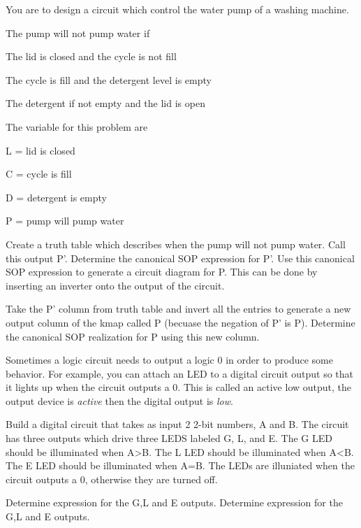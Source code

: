

You are to design a circuit which control the water pump of
a washing machine.

The pump will not pump water if
\begin{description}
\item The lid is closed and the cycle is not fill
\item The cycle is fill and the detergent level is empty
\item The detergent if not empty and the lid is open
\end{description}

The variable for this problem are
\begin{description}
\item L = lid is closed
\item C = cycle is fill
\item D = detergent is empty
\item P = pump will pump water
\end{description}

Create a truth table which describes when the pump will not
pump water.  Call this output P'.  Determine the canonical SOP 
expression for P'.  Use this canonical SOP expression to generate 
a circuit diagram for P.  This can be done by inserting an 
inverter onto the output of the circuit.

Take the P' column from truth table and invert all the entries
to generate a new output column of the kmap called P (becuase
the negation of P' is P).  Determine the canonical SOP 
realization for P using this new column.




Sometimes a logic circuit needs to output a logic 0 in order to
produce some behavior.  For example, you can attach an LED to
a digital circuit output so that it lights up when the circuit 
outputs a 0.  This is called an active low output, the output
device is {\it active} then the digital output is {\it low}.

Build a digital circuit that takes as input 2 2-bit numbers,
A and B.  The circuit has three outputs which drive three
LEDS labeled G, L, and E.  
The G LED should be illuminated when A>B.
The L LED should be illuminated when A<B.
The E LED should be illuminated when A=B.
The LEDs are illuniated when the circuit outputs a 0, otherwise
they are turned off.

Determine \SOPmin expression for the G,L and E outputs.
Determine \POSmin expression for the G,L and E outputs.







